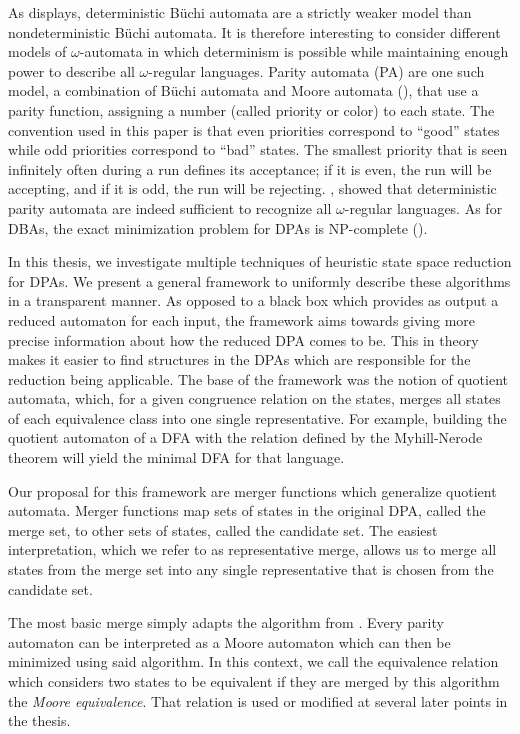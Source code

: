 As \cite{Thomas1991} displays, deterministic B\"uchi automata are a strictly weaker model than nondeterministic Büchi automata. It is therefore interesting to consider different models of $\omega$-automata in which determinism is possible while maintaining enough power to describe all $\omega$-regular languages. 
Parity automata (PA) are one such model, a combination of B\"uchi automata and Moore automata (\cite{Moore56}), that use a parity function, assigning a number (called priority or color) to each state. The convention used in this paper is that even priorities correspond to \enquote{good} states while odd priorities correspond to \enquote{bad} states. The smallest priority that is seen infinitely often during a run defines its acceptance; if it is even, the run will be accepting, and if it is odd, the run will be rejecting.
\cite{Mostowski1991}, \cite{Thomas1997} showed that deterministic parity automata are indeed sufficient to recognize all $\omega$-regular languages. As for DBAs, the exact minimization problem for DPAs is NP-complete (\cite{Schewe2010}).
\vspace{5pt}

In this thesis, we investigate multiple techniques of heuristic state space reduction for DPAs. We present a general framework to uniformly describe these algorithms in a transparent manner. As opposed to a black box which provides as output a reduced automaton for each input, the framework aims towards giving more precise information about how the reduced DPA comes to be. This in theory makes it easier to find structures in the DPAs which are responsible for the reduction being applicable.
The base of the framework was the notion of quotient automata, which, for a given congruence relation on the states, merges all states of each equivalence class into one single representative. For example, building the quotient automaton of a DFA with the relation defined by the Myhill-Nerode theorem \cite{} will yield the minimal DFA for that language.

Our proposal for this framework are merger functions which generalize quotient automata. Merger functions map sets of states in the original DPA, called the merge set, to other sets of states, called the candidate set. The easiest interpretation, which we refer to as representative merge, allows us to merge all states from the merge set into any single representative that is chosen from the candidate set.


The most basic merge simply adapts the algorithm from \cite{Hopcroft1971}. Every parity automaton can be interpreted as a Moore automaton which can then be minimized using said algorithm. In this context, we call the equivalence relation which considers two states to be equivalent if they are merged by this algorithm the \emph{Moore equivalence}. That relation is used or modified at several later points in the thesis.


